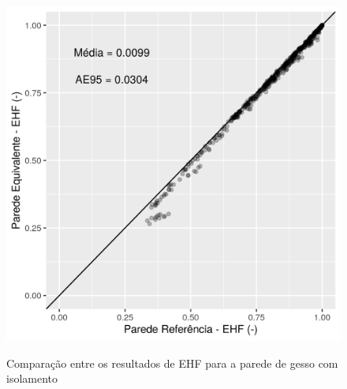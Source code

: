 \documentclass[brazil,hardcopy,openany]{ufscthesis} %
\begin{document}
\begin{figure}[h]
	\centering
	\caption{Comparação entre os resultados de EHF para a parede de gesso com isolamento}
	\includegraphics[width=.5\linewidth]{img/paredeeq_EHF_par3_scatter.png}
	\label{fig:par3_scatter}
\end{figure}
\end{document}
